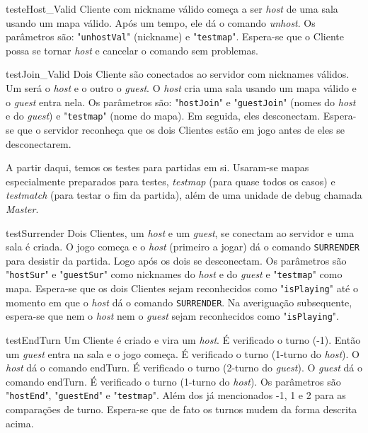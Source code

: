 \begin{itemise}
\teste
    {testeHost\_Valid}
    {Cliente com nickname válido começa a ser \emph{host} de uma sala usando um mapa
    válido. Após um tempo, ele dá o comando \emph{unhost}. Os parâmetros são:
    "\texttt{unhostVal}" (nickname) e "\texttt{testmap}".}
    {Espera-se que o Cliente possa se tornar \emph{host} e cancelar o comando sem
    problemas.}

\teste
    {testJoin\_Valid}
    {Dois Cliente são conectados ao servidor com nicknames válidos. Um será o
    \emph{host} e o outro o \emph{guest}. O \emph{host} cria uma sala usando um mapa
    válido e o \emph{guest} entra nela. Os parâmetros são: "\texttt{hostJoin}" e
    "\texttt{guestJoin}" (nomes do \emph{host} e do \emph{guest}) e
    "\texttt{testmap}" (nome do mapa). Em seguida, eles desconectam.}
    {Espera-se que o servidor reconheça que os dois Clientes estão em jogo antes de
    eles se desconectarem.}

A partir daqui, temos os testes para partidas em si. Usaram-se mapas especialmente preparados para testes,  \emph{testmap} (para quase todos os casos) e \emph{testmatch} (para testar o fim da partida), além de uma unidade de debug chamada \emph{Master}.

\teste
    {testSurrender}
    {Dois Clientes, um \emph{host} e um \emph{guest}, se conectam ao servidor e uma
    sala é criada. O jogo começa e o \emph{host} (primeiro a jogar) dá o comando
    \texttt{SURRENDER} para desistir da partida. Logo após os dois se desconectam.
    Os parâmetros são "\texttt{hostSur}" e "\texttt{guestSur}" como nicknames do
    \emph{host} e do \emph{guest} e "\texttt{testmap}" como mapa.}
    {Espera-se que os dois Clientes sejam reconhecidos como "\texttt{isPlaying}"
    até o momento em que o \emph{host} dá o comando \texttt{SURRENDER}. Na
    averiguação subsequente, espera-se que nem o \emph{host} nem o \emph{guest}
    sejam reconhecidos como "\texttt{isPlaying}".}

\teste
    {testEndTurn}
    {Um Cliente é criado e vira um \emph{host}. É verificado o turno (-1). Então um
    \emph{guest} entra na sala e o jogo começa. É verificado o turno (1-turno do
    \emph{host}). O \emph{host} dá o comando endTurn. É verificado o turno (2-turno
    do \emph{guest}). O \emph{guest} dá o comando endTurn. É verificado o turno
    (1-turno do \emph{host}). Os parâmetros são "\texttt{hostEnd}",
    "\texttt{guestEnd}" e "\texttt{testmap}". Além dos já mencionados -1, 1 e 2 para
    as comparações de turno.}
    {Espera-se que de fato os turnos mudem da forma descrita acima.}


\end{itemise}
